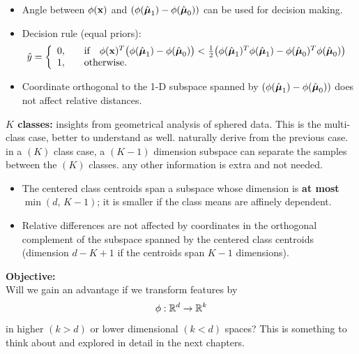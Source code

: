   \begin{itemize}
    \item Angle between $\phi(\bm{\mathrm{x}})$ and $(\phi(\hat{\bm{\mathrm{\mu}}}_1)-\phi(\hat{\bm{\mathrm{\mu}}}_0))$ can be used 
      for decision making.
    \item Decision rule (equal priors):
      {\small
      \begin{displaymath}
        \hat y = \left\{
                \begin{array}{cl}
                  0, & \quad \mbox{if} \quad 
                       \phi(\bm{\mathrm{x}})^T \big( \phi(\hat{\bm{\mathrm{\mu}}}_1) - \phi(\hat{\bm{\mathrm{\mu}}}_0) \big) < 
                       \frac{1}{2} \big( 
                         \phi(\hat{\bm{\mathrm{\mu}}}_1)^T \phi(\hat{\bm{\mathrm{\mu}}}_1) - 
                         \phi(\hat{\bm{\mathrm{\mu}}}_0)^T \phi(\hat{\bm{\mathrm{\mu}}}_0) 
                        \big) \\
                  1, & \quad \mbox{otherwise}.
                \end{array}
              \right.
      \end{displaymath}
      }
    \item Coordinate orthogonal to the 1-D subspace spanned by $(\phi(\hat{\bm{\mathrm{\mu}}}_1)-\phi(\hat{\bm{\mathrm{\mu}}}_0))$ does not affect relative distances.
  \end{itemize}
    \textbf{$K$ classes:} insights from geometrical analysis of sphered data. This is the multi-class case, better to understand as well. naturally derive from the previous case. in a $(K)$ class case, a $(K-1)$ dimension subspace can separate the samples between the $(K)$ classes. any other information is extra and not needed. 
  \begin{itemize}
    \item The centered class centroids span a subspace whose dimension is \textbf{at most} $\min(d,\,K-1)$; it is smaller if the class means are affinely dependent. 
    \item Relative differences are not affected by coordinates in the orthogonal complement of the subspace spanned by the centered class centroids (dimension $d-K+1$ if the centroids span $K-1$ dimensions).
  \end{itemize}
    \textbf{Objective:} \\
  Will we gain an advantage if we transform features by $$\phi: \mathbb{R}^d\rightarrow \mathbb{R}^k$$ in higher $(k>d)$ or lower dimensional $(k<d)$ spaces? This is something to think about and explored in detail in the next chapters. 
  

